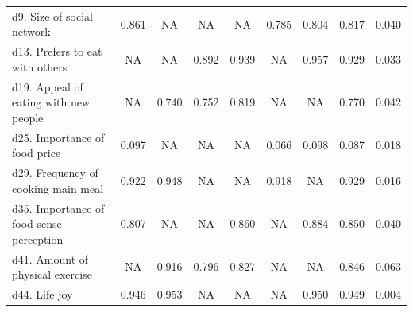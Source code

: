 \begin{table}[ht]
\begin{tabular}{lccccccrr}
d9. Size of social network & 0.861 & NA & NA & NA & 0.785 & 0.804 & \multicolumn{1}{|r}{0.817} & 0.040 \\
d13. Prefers to eat with others & NA & NA & 0.892 & 0.939 & NA & 0.957 & \multicolumn{1}{|r}{0.929} & 0.033 \\
d19. Appeal of eating with new people & NA & 0.740 & 0.752 & 0.819 & NA & NA & \multicolumn{1}{|r}{0.770} & 0.042 \\
d25. Importance of food price & 0.097 & NA & NA & NA & 0.066 & 0.098 & \multicolumn{1}{|r}{0.087} & 0.018 \\
d29. Frequency of cooking main meal & 0.922 & 0.948 & NA & NA & 0.918 & NA & \multicolumn{1}{|r}{0.929} & 0.016 \\
d35. Importance of food sense perception & 0.807 & NA & NA & 0.860 & NA & 0.884 & \multicolumn{1}{|r}{0.850} & 0.040 \\
d41. Amount of physical exercise & NA & 0.916 & 0.796 & 0.827 & NA & NA & \multicolumn{1}{|r}{0.846} & 0.063 \\
d44. Life joy & 0.946 & 0.953 & NA & NA & NA & 0.950 & \multicolumn{1}{|r}{0.949} & 0.004 \\\bottomrule
\end{tabular}%
\end{table}%



